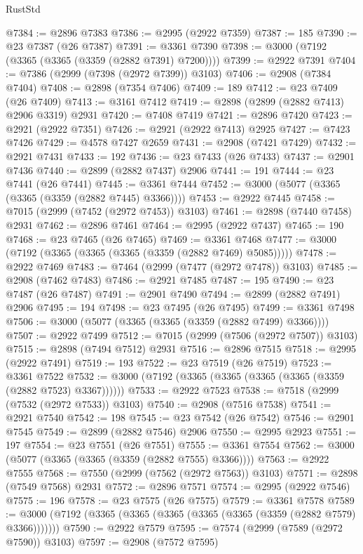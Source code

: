 \begin{lexlean}{RustStd}
\begin{coremodule}
@7384 := @2896 @7383
@7386 := @2995 (@2922 @7359)
@7387 := 185
@7390 := @23 @7387 (@26 @7387)
@7391 := @3361 @7390
@7398 := @3000 (@7192 (@3365 (@3365 (@3359 (@2882 @7391) @7200))))
@7399 := @2922 @7391
@7404 := @7386 (@2999 (@7398 (@2972 @7399)) @3103)
@7406 := @2908 (@7384 @7404)
@7408 := @2898 (@7354 @7406)
@7409 := 189
@7412 := @23 @7409 (@26 @7409)
@7413 := @3161 @7412
@7419 := @2898 (@2899 (@2882 @7413) @2906 @3319) @2931
@7420 := @7408 @7419
@7421 := @2896 @7420
@7423 := @2921 (@2922 @7351)
@7426 := @2921 (@2922 @7413) @2925
@7427 := @7423 @7426
@7429 := @4578 @7427 @2659
@7431 := @2908 (@7421 @7429)
@7432 := @2921 @7431
@7433 := 192
@7436 := @23 @7433 (@26 @7433)
@7437 := @2901 @7436
@7440 := @2899 (@2882 @7437) @2906
@7441 := 191
@7444 := @23 @7441 (@26 @7441)
@7445 := @3361 @7444
@7452 := @3000 (@5077 (@3365 (@3365 (@3359 (@2882 @7445) @3366))))
@7453 := @2922 @7445
@7458 := @7015 (@2999 (@7452 (@2972 @7453)) @3103)
@7461 := @2898 (@7440 @7458) @2931
@7462 := @2896 @7461
@7464 := @2995 (@2922 @7437)
@7465 := 190
@7468 := @23 @7465 (@26 @7465)
@7469 := @3361 @7468
@7477 := @3000 (@7192 (@3365 (@3365 (@3365 (@3359 (@2882 @7469) @5085)))))
@7478 := @2922 @7469
@7483 := @7464 (@2999 (@7477 (@2972 @7478)) @3103)
@7485 := @2908 (@7462 @7483)
@7486 := @2921 @7485
@7487 := 195
@7490 := @23 @7487 (@26 @7487)
@7491 := @2901 @7490
@7494 := @2899 (@2882 @7491) @2906
@7495 := 194
@7498 := @23 @7495 (@26 @7495)
@7499 := @3361 @7498
@7506 := @3000 (@5077 (@3365 (@3365 (@3359 (@2882 @7499) @3366))))
@7507 := @2922 @7499
@7512 := @7015 (@2999 (@7506 (@2972 @7507)) @3103)
@7515 := @2898 (@7494 @7512) @2931
@7516 := @2896 @7515
@7518 := @2995 (@2922 @7491)
@7519 := 193
@7522 := @23 @7519 (@26 @7519)
@7523 := @3361 @7522
@7532 := @3000 (@7192 (@3365 (@3365 (@3365 (@3365 (@3359 (@2882 @7523) @3367))))))
@7533 := @2922 @7523
@7538 := @7518 (@2999 (@7532 (@2972 @7533)) @3103)
@7540 := @2908 (@7516 @7538)
@7541 := @2921 @7540
@7542 := 198
@7545 := @23 @7542 (@26 @7542)
@7546 := @2901 @7545
@7549 := @2899 (@2882 @7546) @2906
@7550 := @2995 @2923
@7551 := 197
@7554 := @23 @7551 (@26 @7551)
@7555 := @3361 @7554
@7562 := @3000 (@5077 (@3365 (@3365 (@3359 (@2882 @7555) @3366))))
@7563 := @2922 @7555
@7568 := @7550 (@2999 (@7562 (@2972 @7563)) @3103)
@7571 := @2898 (@7549 @7568) @2931
@7572 := @2896 @7571
@7574 := @2995 (@2922 @7546)
@7575 := 196
@7578 := @23 @7575 (@26 @7575)
@7579 := @3361 @7578
@7589 := @3000 (@7192 (@3365 (@3365 (@3365 (@3365 (@3365 (@3359 (@2882 @7579) @3366)))))))
@7590 := @2922 @7579
@7595 := @7574 (@2999 (@7589 (@2972 @7590)) @3103)
@7597 := @2908 (@7572 @7595)

\end{coremodule}
\end{lexlean}
